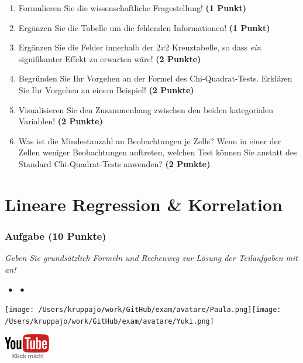 \documentclass[a4paper, 9pt]{scrartcl}\usepackage[]{graphicx}\usepackage[]{xcolor}
\begin{document}
\begin{enumerate}
  \item Formulieren Sie die wissenschaftliche Fragestellung! \textbf{(1 Punkt)}
\item Ergänzen Sie die Tabelle um die fehlenden Informationen! \textbf{(1 Punkt)} 
\item Ergänzen Sie die Felder innerhalb der $2x2$ Kreuztabelle, so dass \textit{ein} signifikanter Effekt zu erwarten wäre! \textbf{(2 Punkte)}
\item Begründen Sie Ihr Vorgehen an der Formel des Chi-Quadrat-Tests. Erklären Sie Ihr Vorgehen an einem Beispiel! \textbf{(2 Punkte)}
\item Visualisieren Sie den Zusammenhang zwischen den beiden kategorialen Variablen! \textbf{(2 Punkte)}
\item Was ist die Mindestanzahl an Beobachtungen je Zelle? Wenn in einer der Zellen weniger Beobachtungen auftreten, welchen Test können Sie anstatt des Standard Chi-Quadrat-Tests anwenden? \textbf{(2 Punkte)}
\end{enumerate} 
\clearpage
\part{Lineare Regression \& Korrelation}

\section{Aufgabe \hfill (10 Punkte)}

\textit{Geben Sie grundsätzlich Formeln und Rechenweg zur Lösung der Teilaufgaben mit an!} \\[1Ex]
 

 
\ifcollection
\begin{flushright}
\tiny\vspace{-3Ex}
\textbf{\examinhaltstart}
\exammodulestat $\;\bullet$
\exammodulestatbbv $\;\bullet$
\exammodulestatversuch 
\vspace{-4Ex}
\end{flushright}
\begin{minipage}[t]{0.5\textwidth}
\texttt{[image: /Users/kruppajo/work/GitHub/exam/avatare/Paula.png]}\hspace{-4mm}\texttt{[image: /Users/kruppajo/work/GitHub/exam/avatare/Yuki.png]}
\end{minipage}
\begin{minipage}[t]{0.5\textwidth}
\hfill
\href{https://youtu.be/kHmfEmU6lrk}{\includegraphics[width = 2cm]{img/youtube}}
\end{minipage}
\fi
\end{document}
